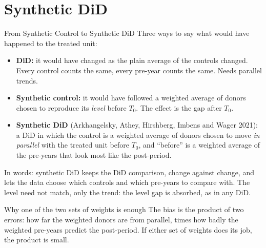 \documentclass[main.tex]{subfiles}
\begin{document}
\section{Synthetic DiD}

\begin{frame}{From Synthetic Control to Synthetic DiD}
  \small
  Three ways to say what would have happened to the treated unit:
  \begin{itemize}\small
    \item \textbf{DiD:} it would have changed as the plain average of the
      controls changed. Every control counts the same, every pre-year counts
      the same. Needs parallel trends.
    \item \textbf{Synthetic control:} it would have followed a weighted
      average of donors chosen to reproduce its \emph{level} before $T_0$.
      The effect is the gap after $T_0$.
    \item \textbf{Synthetic DiD} (Arkhangelsky, Athey, Hirshberg, Imbens and
      Wager 2021): a DiD in which the control is a weighted average of donors
      chosen to move \emph{in parallel} with the treated unit before $T_0$,
      and ``before'' is a weighted average of the pre-years that look most
      like the post-period.
  \end{itemize}
  \medskip
  In words: synthetic DiD keeps the DiD comparison, change against change,
  and lets the data choose which controls and which pre-years to compare
  with. The level need not match, only the trend: the level gap is absorbed,
  as in any DiD.
  \medskip
  \begin{block}{\footnotesize Why one of the two sets of weights is enough}
    \footnotesize The bias is the product of two errors: how far the weighted
    donors are from parallel, times how badly the weighted pre-years predict
    the post-period. If either set of weights does its job, the product is
    small.
  \end{block}
\end{frame}
\end{document}
